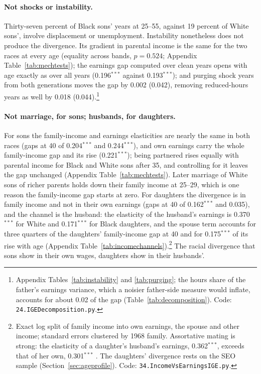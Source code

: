 \paragraph{Not shocks or instability.} Thirty-seven percent of Black sons' years at 25--55, against 19 percent of White
sons', involve displacement or unemployment. Instability nonetheless does not produce the divergence. Its gradient in
parental income is the same for the two races at every age (equality across bands, $p=0.524$;
Appendix Table~\ref{tab:mechtests}); the earnings gap computed over clean years opens with age exactly as over all years
(0.196$^{***}$ against 0.193$^{***}$); and purging shock years from both generations moves the gap by 0.002 (0.042),
removing reduced-hours years as well by 0.018 (0.044).\footnote{Appendix Tables~\ref{tab:instability} and
\ref{tab:purging}; the hours share of the father's earnings variance, which a noisier father-side measure would
inflate, accounts for about 0.02 of the gap (Table~\ref{tab:decomposition}). Code: \texttt{24.IGEDecomposition.py}.}

\paragraph{Not marriage, for sons; husbands, for daughters.} For sons the family-income and earnings elasticities are
nearly the same in both races (gaps at 40 of 0.204$^{***}$ and 0.244$^{***}$), and own earnings carry the whole
family-income gap and its rise (0.221$^{***}$); being partnered rises equally with parental income for Black and White
sons after 35, and controlling for it leaves the gap unchanged (Appendix Table~\ref{tab:mechtests}). Later marriage of White
sons of richer parents holds down their family income at 25--29, which is one reason the family-income gap starts at
zero. For daughters the divergence is in family income and not in their own earnings (gaps at 40 of 0.162$^{***}$ and
0.035), and the channel is the husband: the elasticity of the husband's earnings is 0.370$^{***}$ for White and
0.171$^{***}$ for Black daughters, and the spouse term accounts for three quarters of the daughters' family-income gap
at 40 and for 0.175$^{***}$ of its rise with age (Appendix Table~\ref{tab:incomechannels}).\footnote{Exact log split of family
income into own earnings, the spouse and other income; standard errors clustered by 1968 family. Assortative mating is
strong: the elasticity of a daughter's husband's earnings, 0.362$^{***}$, exceeds that of her own, 0.301$^{***}$
\citep[as in][]{chadwick2002intergenerational}. The daughters' divergence rests on the SEO sample
(Section~\ref{sec:ageprofile}). Code: \texttt{34.IncomeVsEarningsIGE.py}.} The racial divergence that sons show in
their own wages, daughters show in their husbands'.


